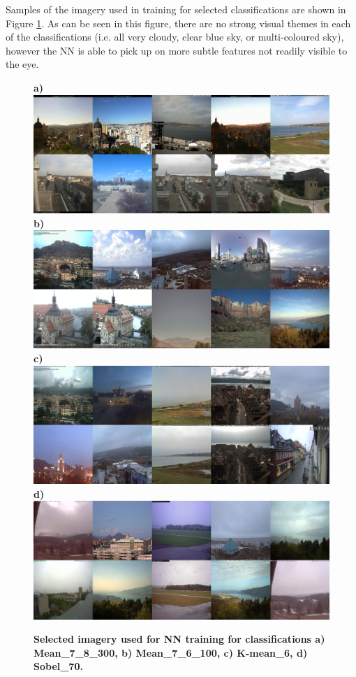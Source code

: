 \documentclass[final,3p,times,authoryear]{elsarticle}
\begin{document}
Samples of the imagery used in training for selected classifications are shown in Figure \ref{fig:classImages}. As can be seen in this figure, there are no strong visual themes in each of the classifications (i.e. all very cloudy, clear blue sky, or multi-coloured sky), however the NN is able to pick up on  more subtle features not readily visible to the eye. 

\begin{figure}
\centering
\textbf{a)}\includegraphics[trim = 0mm 0mm 0mm 0mm,clip,scale=0.14]{Images/13-0_Mean_7_8_300_tiles.png}
\textbf{b)}\includegraphics[trim = 0mm 0mm 0mm 0mm,clip,scale=0.14]{Images/13-3_Mean_7_6_100_tiles.png}
\textbf{c)}\includegraphics[trim = 0mm 0mm 0mm 0mm,clip,scale=0.14]{Images/13-5_K-mean_6_tiles.png}
\textbf{d)}\includegraphics[trim = 0mm 0mm 0mm 0mm,clip,scale=0.14]{Images/13-9_Sobel_70_tiles.png}
\caption{\textbf{Selected imagery used for NN training for classifications 
a) Mean\_7\_8\_300, b) Mean\_7\_6\_100, c) K-mean\_6, d) Sobel\_70.}}
\label{fig:classImages}
\end{figure}
\end{document}
